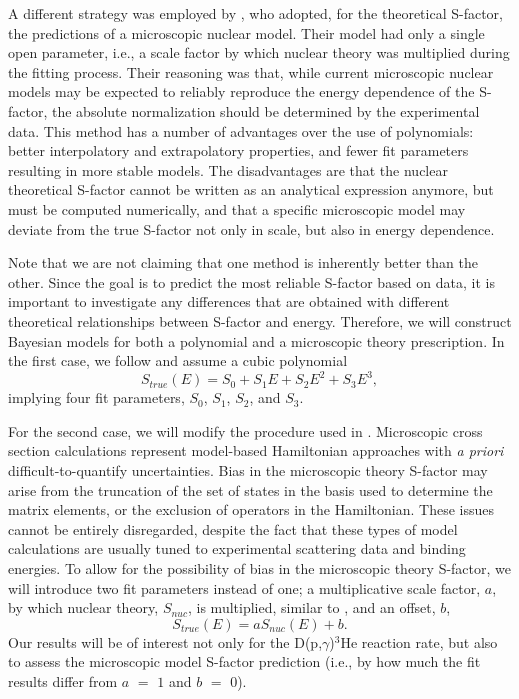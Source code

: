 \documentclass[twocolumn]{aastex63}
\begin{document}
A different strategy was employed by \citet{Coc15,iliadis16}, who adopted, for the theoretical S-factor, the predictions of a microscopic nuclear model. Their model had only a single open parameter, i.e., a scale factor by which nuclear theory was multiplied during the fitting process. Their reasoning was that, while current microscopic nuclear models may be expected to reliably reproduce the energy dependence of the S-factor, the absolute normalization should be determined by the experimental data. This method has a number of advantages over the use of polynomials: better interpolatory and extrapolatory properties, and fewer fit parameters resulting in more stable models. The disadvantages are that the nuclear theoretical S-factor cannot be written as an analytical expression anymore, but must be computed numerically, and that a specific microscopic model may deviate from the true S-factor not only in scale, but also in energy dependence.

Note that we are not claiming that one method is inherently better than the other. Since the goal is to predict the most reliable S-factor based on data, it is important to investigate any differences that are obtained with different theoretical relationships between S-factor and energy. Therefore, we will construct Bayesian models for both a polynomial and a microscopic theory prescription. In the first case, we follow \citet{Mossa20,Yeh21,Pis21} and assume a cubic polynomial
%
\begin{equation}
\label{eq:poly}
S_{true}(E) = S_0 + S_1 E + S_2 E^2 + S_3 E^3,
\end{equation}
%
implying four fit parameters, $S_0$, $S_1$, $S_2$, and $S_3$. 

For the second case, we will modify the procedure used in \citet{Coc15,iliadis16}. Microscopic cross section calculations represent model-based Hamiltonian approaches with {\it a priori} difficult-to-quantify uncertainties. Bias in the microscopic theory S-factor may arise from the truncation of the set of states in the basis used to determine the matrix elements, or the exclusion of operators in the Hamiltonian. These issues cannot be entirely disregarded, despite the fact that these types of model calculations are usually tuned to experimental scattering data and binding energies. To allow for the possibility of bias in the microscopic theory S-factor, we will introduce two fit parameters instead of one; a multiplicative scale factor, $a$, by which nuclear theory, $S_{nuc}$, is multiplied, similar to \citet{Coc15,iliadis16}, and an offset, $b$, 
%
\begin{equation}
\label{eq:theory}
S_{true}(E) = a S_{nuc}(E) + b.
\end{equation}
%
Our results will be of interest not only for the D(p,$\gamma$)$^3$He reaction rate, but also to assess the microscopic model S-factor prediction (i.e., by how much the fit results differ from $a$ $=$ $1$ and $b$ $=$ $0$).
\end{document}
